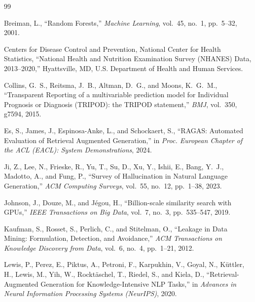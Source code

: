 \documentclass[11pt,a4paper]{article}
\begin{document}
\newcommand{\bibspace}[0]{\vspace*{0.1cm}}
\begin{thebibliography}{99}

Breiman, L.,
\newblock ``{Random Forests},''
\newblock \emph{Machine Learning}, vol.~45, no.~1, pp.~5--32, 2001.

\bibspace
{}
Centers for Disease Control and Prevention, National Center for Health Statistics,
\newblock ``{National Health and Nutrition Examination Survey (NHANES) Data,
2013--2020},''
\newblock Hyattsville, MD, U.S. Department of Health and Human Services.

\bibspace
{}
Collins, G.~S., Reitsma, J.~B., Altman, D.~G., and Moons, K.~G.~M.,
\newblock ``{Transparent Reporting of a multivariable prediction model for
Individual Prognosis or Diagnosis (TRIPOD): the TRIPOD statement},''
\newblock \emph{BMJ}, vol.~350, g7594, 2015.

\bibspace
{}
Es, S., James, J., Espinosa-Anke, L., and Schockaert, S.,
\newblock ``{RAGAS: Automated Evaluation of Retrieval Augmented Generation},''
\newblock in \emph{Proc. European Chapter of the ACL (EACL): System
Demonstrations}, 2024.

\bibspace
{}
Ji, Z., Lee, N., Frieske, R., Yu, T., Su, D., Xu, Y., Ishii, E., Bang, Y.~J.,
Madotto, A., and Fung, P.,
\newblock ``{Survey of Hallucination in Natural Language Generation},''
\newblock \emph{ACM Computing Surveys}, vol.~55, no.~12, pp.~1--38, 2023.

\bibspace
{}
Johnson, J., Douze, M., and J\'egou, H.,
\newblock ``{Billion-scale similarity search with GPUs},''
\newblock \emph{IEEE Transactions on Big Data}, vol.~7, no.~3, pp.~535--547, 2019.

\bibspace
{}
Kaufman, S., Rosset, S., Perlich, C., and Stitelman, O.,
\newblock ``{Leakage in Data Mining: Formulation, Detection, and Avoidance},''
\newblock \emph{ACM Transactions on Knowledge Discovery from Data}, vol.~6, no.~4,
pp.~1--21, 2012.

\bibspace
{}
Lewis, P., Perez, E., Piktus, A., Petroni, F., Karpukhin, V., Goyal, N.,
K\"uttler, H., Lewis, M., Yih, W., Rockt\"aschel, T., Riedel, S., and Kiela, D.,
\newblock ``{Retrieval-Augmented Generation for Knowledge-Intensive NLP Tasks},''
\newblock in \emph{Advances in Neural Information Processing Systems (NeurIPS)},
2020.


\end{thebibliography}
\end{document}

